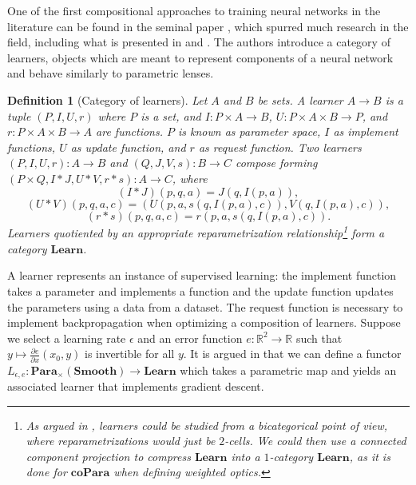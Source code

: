\documentclass[12pt,a4paper,openright,twoside]{report}
\theoremstyle{plain}
\newtheorem{definition}[proposition]{Definition}
\theoremstyle{definition}
\begin{document}
One of the first compositional approaches to training neural networks in the literature can be found in the seminal paper \cite{fong2019backprop}, which spurred much research in the field, including what is presented in \cite{gavranovic2024fundamental} and \cite{cruttwell2022categorical}. The authors introduce a category of learners, objects which are meant to represent components of a neural network and behave similarly to parametric lenses. 


\begin{definition}[Category of learners]
  Let $A$ and $B$ be sets. A learner $A \to B$ is a tuple $(P, I, U, r)$ where $P$ is a set, and $I: P \times A \to B$, $U: P \times A \times B \to P$, and $r: P \times A \times B \to A$ are functions.
  $P$ is known as parameter space, $I$ as implement functions, $U$ as update function, and $r$ as request function. Two learners $(P, I, U, r): A \to B$ and $(Q, J, V, s): B \to C$ compose forming $(P \times Q, I \ast J, U \ast V, r \ast s ): A \to C$, where
  \[(I \ast J)(p,q,a) = J(q,I(p,a)),\]
  \[(U \ast V)(p,q,a,c) = (U(p,a,s(q,I(p,a),c)), V(q,I(p,a),c)),\]
  \[(r \ast s)(p,q,a,c) = r(p,a,s(q,I(p,a),c)).\]
  Learners quotiented by an appropriate reparametrization relationship\footnote{As argued in \cite{fong2019backprop}, learners could be studied from a bicategorical point of view, where reparametrizations would just be $2$-cells. We could then use a connected component projection to compress $\mathbf{Learn}$ into a $1$-category $\mathbf{Learn}$, as it is done for $\mathbf{coPara}$ when defining weighted optics.} form a category $\mathbf{Learn}$.
\end{definition}

A learner represents an instance of supervised learning: the implement function takes a parameter and implements a function and the update function updates the parameters using a data from a dataset. The request function is necessary to implement backpropagation when optimizing a composition of learners. Suppose we select a learning rate $\epsilon$ and an error function $e: \mathbb{R}^2 \to \mathbb{R}$ such that $y \mapsto \frac{\partial e }{\partial x}(x_0, y)$ is invertible for all $y$. It is argued in \cite{fong2019backprop} that we can define a functor $L_{\epsilon, e}: \mathbf{Para}_{\times}(\mathbf{Smooth}) \to \mathbf{Learn}$ which takes a parametric map and yields an associated learner that implements gradient descent. 
\end{document}
